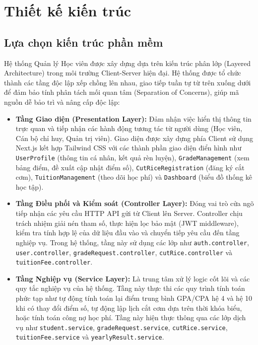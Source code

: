 \documentclass[../DoAn.tex]{subfiles}
\begin{document}
\section{Thiết kế kiến trúc}
\subsection{Lựa chọn kiến trúc phần mềm}

Hệ thống Quản lý Học viên được xây dựng dựa trên kiến trúc phân lớp (Layered Architecture) trong môi trường Client-Server hiện đại. Hệ thống được tổ chức thành các tầng độc lập xếp chồng lên nhau, giao tiếp tuần tự từ trên xuống dưới để đảm bảo tính phân tách mối quan tâm (Separation of Concerns), giúp mã nguồn dễ bảo trì và nâng cấp độc lập:
\begin{itemize}
    \item \textbf{Tầng Giao diện (Presentation Layer):} Đảm nhận việc hiển thị thông tin trực quan và tiếp nhận các hành động tương tác từ người dùng (Học viên, Cán bộ chỉ huy, Quản trị viên). Giao diện được xây dựng phía Client sử dụng Next.js kết hợp Tailwind CSS với các thành phần giao diện điển hình như \texttt{UserProfile} (thông tin cá nhân, kết quả rèn luyện), \texttt{GradeManagement} (xem bảng điểm, đề xuất cập nhật điểm số), \texttt{CutRiceRegistration} (đăng ký cắt cơm), \texttt{TuitionManagement} (theo dõi học phí) và \texttt{Dashboard} (biểu đồ thống kê học tập).
    
    \item \textbf{Tầng Điều phối và Kiểm soát (Controller Layer):} Đóng vai trò cửa ngõ tiếp nhận các yêu cầu HTTP API gửi từ Client lên Server. Controller chịu trách nhiệm giải nén tham số, thực hiện lọc bảo mật (JWT middleware), kiểm tra tính hợp lệ của dữ liệu đầu vào và chuyển tiếp yêu cầu đến tầng nghiệp vụ. Trong hệ thống, tầng này sử dụng các lớp như \texttt{auth.controller}, \texttt{user.controller}, \texttt{gradeRequest.controller}, \texttt{cutRice.controller} và \texttt{tuitionFee.controller}.
    
    \item \textbf{Tầng Nghiệp vụ (Service Layer):} Là trung tâm xử lý logic cốt lõi và các quy tắc nghiệp vụ của hệ thống. Tầng này thực thi các quy trình tính toán phức tạp như tự động tính toán lại điểm trung bình GPA/CPA hệ 4 và hệ 10 khi có thay đổi điểm số, tự động lập lịch cắt cơm dựa trên thời khóa biểu, hoặc tính toán công nợ học phí. Tầng này hiện thực thông qua các lớp dịch vụ như \texttt{student.service}, \texttt{gradeRequest.service}, \texttt{cutRice.service}, \texttt{tuitionFee.service} và \texttt{yearlyResult.service}.
    

\end{itemize}
\end{document}
